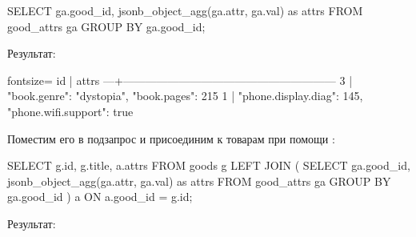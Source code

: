 \begin{english}
  \begin{clojure}
SELECT
  ga.good_id,
  jsonb_object_agg(ga.attr, ga.val) as attrs
FROM good_attrs ga
  GROUP BY ga.good_id;
  \end{clojure}
\end{english}

Результат:


\begin{english}
  \begin{text*}{fontsize=\small}
id |                          attrs
---+---------------------------------------------------------
 3 | {"book.genre": "dystopia", "book.pages": 215}
 1 | {"phone.display.diag": 145, "phone.wifi.support": true}
  \end{text*}
\end{english}

Поместим его в подзапрос и присоединим к товарам при помощи :

\begin{english}
  \begin{sql}
SELECT
  g.id,
  g.title,
  a.attrs
FROM
  goods g
LEFT JOIN (
  SELECT
    ga.good_id,
    jsonb_object_agg(ga.attr, ga.val) as attrs
  FROM good_attrs ga
    GROUP BY ga.good_id
) a ON a.good_id = g.id;
  \end{sql}
\end{english}

Результат:


